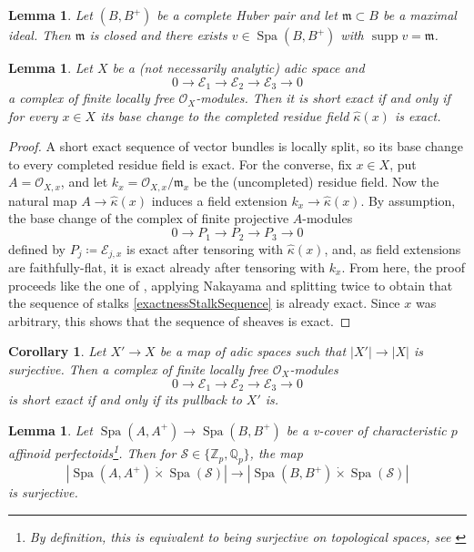 \documentclass[10pt,twoside]{article}
\numberwithin{equation}{section}
\theoremstyle{plain}
\newtheorem{mylemma}[mythm]{Lemma}
\newtheorem{mycor}[mythm]{Corollary}
\theoremstyle{definition}
\DeclareMathOperator{\Spa}{Spa}
\newcommand{\ZZ}{\mathbb{Z}}
\newcommand{\QQ}{\mathbb{Q}}
\newcommand{\MCE}{\mathcal{E}}
\newcommand{\MCO}{\mathcal{O}}
\newcommand{\MCS}{\mathcal{S}}
\newcommand{\mfm}{\mathfrak{m}}
\DeclareMathOperator{\supp}{supp}
\begin{document}
\begin{mylemma}\emph{\cite[Proposition 7.51]{Wed19}}\label{adicPointsFromClassicalPoints}
    Let \((B,B^+)\) be a complete Huber pair and let \(\mfm\subset B\) be a maximal ideal. Then \(\mfm\) is closed and there exists \(v\in \Spa(B,B^+)\) with \(\supp v = \mfm\).
\end{mylemma}

\begin{mylemma}\label{exactnessAdicLocal}
Let \(X\) be a (not necessarily analytic) adic space and
\[0\longrightarrow\MCE_1\longrightarrow\MCE_2\longrightarrow\MCE_3\longrightarrow0\]
a complex of finite locally free \(\MCO_X\)-modules. Then it is short exact if and only if for every \(x\in X\) its base change to the completed residue field \(\hat\kappa(x)\) is exact.
\end{mylemma}


\begin{proof}
    A short exact sequence of vector bundles is locally split, so its base change to every completed residue field is exact. For the converse, fix \(x\in X\), put \(A=\MCO_{X,x}\), and let \(k_x=\MCO_{X,x}/\mfm_x\) be the (uncompleted) residue field. Now the natural map \(A\to\hat\kappa(x)\) induces a field extension \(k_x\to\hat\kappa(x)\). By assumption, the base change of the complex of finite projective \(A\)-modules
\[0\longrightarrow P_1\longrightarrow P_2\longrightarrow P_3\longrightarrow0\tag{*}\label{exactnessStalkSequence}\]
defined by \(P_j\coloneqq\MCE_{j,x}\) is exact after tensoring with \(\hat\kappa(x)\), and, as field extensions are faith\-fully-flat, it is exact already after tensoring with \(k_x\). From here, the proof proceeds like the one of , applying Nakayama and splitting twice to obtain that the sequence of stalks \eqref{exactnessStalkSequence} is already exact. Since \(x\) was arbitrary, this shows that the sequence of sheaves is exact.
\end{proof}

\begin{mycor}\label{exactnessAdicLocalCorollary}
    Let \(X'\to X\) be a map of adic spaces such that \(|X'|\to |X|\) is surjective. Then a complex of finite locally free \(\MCO_X\)-modules
    \[0\longrightarrow\MCE_1\longrightarrow\MCE_2\longrightarrow\MCE_3\longrightarrow0\]
    is short exact if and only if its pullback to \(X'\) is.
\end{mycor}




\begin{mylemma}\label{YcoSurjectiveness}
    Let \(\Spa(A,A^+)\to \Spa(B,B^+)\) be a v-cover of characteristic \(p\) affinoid perfectoids\footnote{By definition, this is equivalent to being surjective on topological spaces, see \cite[Definition 17.1.1]{SW20}}. Then for \(\MCS\in \{\ZZ_p,\QQ_p\}\), the map
    \[|\Spa(A,A^+)\dot\times \Spa(\MCS)|\longrightarrow |\Spa(B,B^+)\dot\times \Spa(\MCS)|\]
    is surjective.
\end{mylemma}
\end{document}
